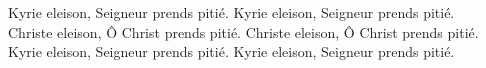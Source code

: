 Kyrie eleison, Seigneur prends pitié. Kyrie eleison, Seigneur prends pitié.\\
Christe eleison, Ô Christ prends pitié. Christe eleison, Ô Christ prends pitié.\\
Kyrie eleison, Seigneur prends pitié. Kyrie eleison, Seigneur prends pitié.
